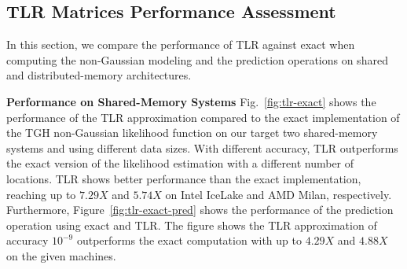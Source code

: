 \documentclass[conference]{IEEEtran}
\begin{document}
\subsection{TLR Matrices Performance Assessment}
In this section, we compare the performance of TLR 
against exact when computing the non-Gaussian modeling and the prediction operations
on shared and distributed-memory architectures. 



\textbf{Performance on Shared-Memory Systems}
Fig.~\ref{fig:tlr-exact} shows the performance of the
TLR approximation compared to the exact implementation
of the TGH non-Gaussian likelihood function on our target two
shared-memory systems and using different data sizes.  With different accuracy, TLR outperforms the exact version of the likelihood estimation with a different number of locations. TLR shows better performance than the exact implementation, reaching up to $7.29X$ and $5.74X$ on Intel IceLake and AMD Milan, respectively.   Furthermore, Figure~\ref{fig:tlr-exact-pred} shows the performance of the prediction operation using
exact and TLR. The figure shows the TLR approximation of
accuracy $10^{-9}$ outperforms the exact computation with
up to $4.29X$ and $4.88X$ on the given machines.
\end{document}
